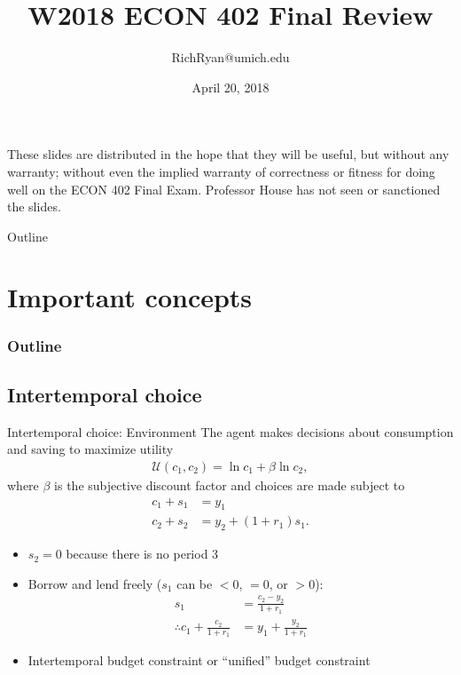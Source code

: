 \documentclass[presentation,dvipsnames]{beamer}
\author{RichRyan@umich.edu}
\date{April 20, 2018}
\title{W2018 ECON 402 Final Review}
\begin{document}
\begin{frame}
These slides are distributed in the hope that they will be useful,
but without any warranty;
without even the implied warranty of correctness or fitness for doing well on the ECON 402 Final Exam.
Professor House has not seen or sanctioned the slides.
\end{frame}

\maketitle
\begin{frame}{Outline}
\tableofcontents
\end{frame}

\section{Important concepts}

\begin{frame}
\frametitle{Outline}
\tableofcontents[currentsection]
\end{frame}

\subsection{Intertemporal choice}
\label{sec-2}

\begin{frame}[label=sec-2-1]{Intertemporal choice: Environment}
The agent makes decisions about consumption and saving to maximize utility
\begin{align*}
\mathcal{U}(c_{1},c_{2}) = \ln c_{1} + \beta \ln c_{2},
\end{align*}
where $\beta$ is the subjective discount factor and choices are made subject to
\begin{align*}
c_{1} + s_{1} &= y_{1} \\
c_{2} + s_{2} &= y_{2} + (1+r_{1})s_{1}.
\end{align*}
\begin{itemize}[label={--}]
\item $s_{2} = 0$ because there is no period 3
\item Borrow and lend freely ($s_{1}$ can be $<0$, $=0$, or $>0$):
\begin{align*}
s_{1} &= \frac{c_{2}-y_{2}}{1+r_{1}} \\
\therefore c_{1} + \frac{c_{2}}{1+r_{1}} &= y_{1} + \frac{y_{2}}{1+r_{1}}
\end{align*}
\item Intertemporal budget constraint or ``unified'' budget constraint
\end{itemize}
\end{frame}
\end{document}
